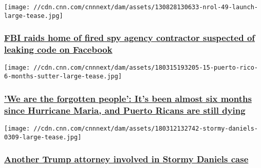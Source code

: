 \href{/2018/03/16/us/fbi-raids-home-of-suspected-spy-agency-leaker-invs/index.html}{}

\texttt{[image: //cdn.cnn.com/cnnnext/dam/assets/130828130633-nrol-49-launch-large-tease.jpg]}

\hypertarget{fbi-raids-home-of-fired-spy-agency-contractor-suspected-of-leaking-code-on-facebook}{%
\subsubsection{\texorpdfstring{\href{/2018/03/16/us/fbi-raids-home-of-suspected-spy-agency-leaker-invs/index.html}{FBI
raids home of fired spy agency contractor suspected of leaking code on
Facebook}}{FBI raids home of fired spy agency contractor suspected of leaking code on Facebook}}\label{fbi-raids-home-of-fired-spy-agency-contractor-suspected-of-leaking-code-on-facebook}}

\href{/2018/03/15/politics/puerto-rico-six-month-deaths-sutter-invs/index.html}{}

\texttt{[image: //cdn.cnn.com/cnnnext/dam/assets/180315193205-15-puerto-rico-6-months-sutter-large-tease.jpg]}

\hypertarget{we-are-the-forgotten-people-its-been-almost-six-months-since-hurricane-maria-and-puerto-ricans-are-still-dying}{%
\subsubsection{\texorpdfstring{\href{/2018/03/15/politics/puerto-rico-six-month-deaths-sutter-invs/index.html}{'We
are the forgotten people': It's been almost six months since Hurricane
Maria, and Puerto Ricans are still
dying}}{'We are the forgotten people': It's been almost six months since Hurricane Maria, and Puerto Ricans are still dying}}\label{we-are-the-forgotten-people-its-been-almost-six-months-since-hurricane-maria-and-puerto-ricans-are-still-dying}}

\href{/2018/03/14/politics/stormy-daniels-jill-martin-trump-organization/index.html}{}

\texttt{[image: //cdn.cnn.com/cnnnext/dam/assets/180312132742-stormy-daniels-0309-large-tease.jpg]}

\hypertarget{another-trump-attorney-involved-in-stormy-daniels-case}{%
\subsubsection{\texorpdfstring{\href{/2018/03/14/politics/stormy-daniels-jill-martin-trump-organization/index.html}{Another
Trump attorney involved in Stormy Daniels
case}}{Another Trump attorney involved in Stormy Daniels case}}\label{another-trump-attorney-involved-in-stormy-daniels-case}}

